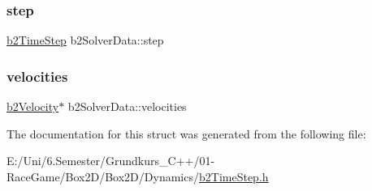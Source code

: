 \subsubsection{\texorpdfstring{step}{step}}
{\footnotesize\ttfamily \mbox{\hyperlink{structb2_time_step}{b2\+Time\+Step}} b2\+Solver\+Data\+::step}

\mbox{\label{structb2_solver_data_a1072627a3e962a8bc7088657a512191c}} 
\subsubsection{\texorpdfstring{velocities}{velocities}}
{\footnotesize\ttfamily \mbox{\hyperlink{structb2_velocity}{b2\+Velocity}}$\ast$ b2\+Solver\+Data\+::velocities}



The documentation for this struct was generated from the following file\+:\begin{DoxyCompactItemize}
\item 
E\+:/\+Uni/6.\+Semester/\+Grundkurs\+\_\+\+C++/01-\/\+Race\+Game/\+Box2\+D/\+Box2\+D/\+Dynamics/\mbox{\hyperlink{b2_time_step_8h}{b2\+Time\+Step.\+h}}\end{DoxyCompactItemize}
